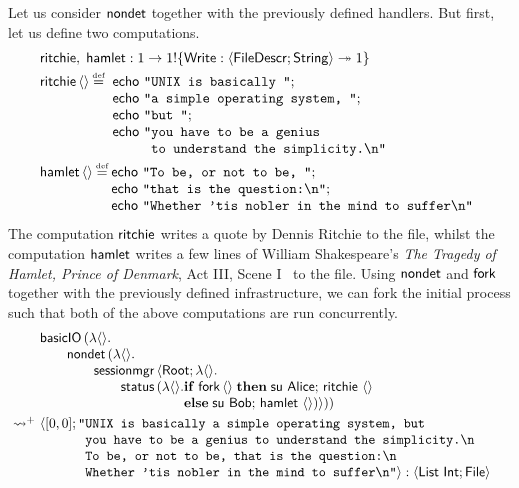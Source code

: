 \documentclass[12pt,phd,lfcs,twoside,openright,logo,leftchapter,normalheadings]{infthesis}
\theoremstyle{plain}
\theoremstyle{definition}
\begin{document}
Let us consider $\mathsf{nondet}$ together with the previously defined
handlers. But first, let us define two computations.
%
\[
  \bl
    \quoteRitchie,\;\quoteHamlet : \UnitType \to \UnitType \eff \{\Write: \Record{\UFD;\String} \opto \UnitType\} \smallskip\\
    \quoteRitchie\,\Unit \defas
      \ba[t]{@{~}l}
        \echo~\strlit{UNIX is basically };\\
        \echo~\strlit{a simple operating system, };\\
        \echo~\strlit{but };\\
        \echo~\texttt{"}
          \ba[t]{@{}l}
             \texttt{you have to be a genius }\\
             \texttt{to understand the simplicity.\nl{}"}
          \ea
      \ea \smallskip\\
    \quoteHamlet\,\Unit \defas
      \ba[t]{@{}l}
        \echo~\strlit{To be, or not to be, };\\
        \echo~\strlit{that is the question:\nl};\\
        \echo~\strlit{Whether 'tis nobler in the mind to suffer\nl}
      \ea
  \el
\]
%
The computation $\mathsf{ritchie}$ writes a quote by Dennis Ritchie to
the file, whilst the computation $\mathsf{hamlet}$ writes a few lines of
William Shakespeare's \emph{The Tragedy of Hamlet, Prince of Denmark},
Act III, Scene I~\cite{Shakespeare6416} to the file.
%
Using $\mathsf{nondet}$ and $\mathsf{fork}$ together with the previously defined
infrastructure, we can fork the initial process such that both of the
above computations are run concurrently.
%
\[
  \ba{@{~}l@{~}l}
    &\bl
    \basicIO\,(\lambda\Unit.\\
         \qquad\nondet\,(\lambda\Unit.\\
           \qquad\qquad\sessionmgr\,\Record{\Root;\lambda\Unit.\\
             \qquad\qquad\qquad\status\,(\lambda\Unit.
                 \ba[t]{@{}l}
                   \If\;\fork\,\Unit\;\Then\;
                       \su~\Alice;\,
                       \quoteRitchie~\Unit\\
                   \Else\;
                       \su~\Bob;\,
                       \quoteHamlet~\Unit)}))
                 \ea
     \el \smallskip\\
     \reducesto^+&
     \Record{
       \ba[t]{@{}l}
         [0, 0];
         \texttt{"}\ba[t]{@{}l}
           \texttt{UNIX is basically a simple operating system, but }\\
           \texttt{you have to be a genius to understand the simplicity.\nl}\\
           \texttt{To be, or not to be, that is the question:\nl}\\
           \texttt{Whether 'tis nobler in the mind to suffer\nl"}} : \Record{\List~\Int; \UFile}
         \ea
       \ea
  \ea
\]
\end{document}
